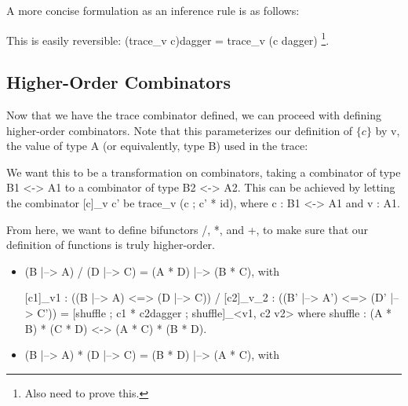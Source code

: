 \documentclass{sigplanconf}
\begin{document}
A more concise formulation as an inference rule is as follows:


This is easily reversible: {{(trace_v c)dagger = trace_v (c dagger)}}
\footnote{Also need to prove this.}.

\subsection{Higher-Order Combinators}

Now that we have the trace combinator defined, we can proceed with defining
higher-order combinators. Note that this parameterizes our definition of
$\{c\}$ by {{v}}, the value of type {{A}} (or equivalently, type {{B}}) used
in the trace:


\noindent
We want this to be a transformation on combinators, taking a combinator of type
{{B1 <-> A1}} to a combinator of type {{B2 <-> A2}}. This can be achieved by
letting the combinator {{{[c]}_v c'}} be {{trace_v (c ; c' * id)}}, where
{{c : B1 <-> A1}} and {{v : A1}}.

From here, we want to define bifunctors {{/}}, {{*}}, and {{+}}, to make sure
that our definition of functions is truly higher-order.

\begin{itemize}

\item {{(B |--> A) / (D |--> C) = (A * D) |--> (B * C)}}, with

{{{[c1]}_{v1} : ((B |--> A) <=> (D |--> C)) / {[c2]}_{v_2} : ((B' |--> A') <=> (D' |--> C')) = {[shuffle ; c1 * c2dagger ; shuffle]}_{<v1, c2 v2>}}}
where
{{shuffle : (A * B) * (C * D) <-> (A * C) * (B * D)}}.

\item {{(B |--> A) * (D |--> C) = (B * D) |--> (A * C)}}, with

\end{itemize}





\end{document}
